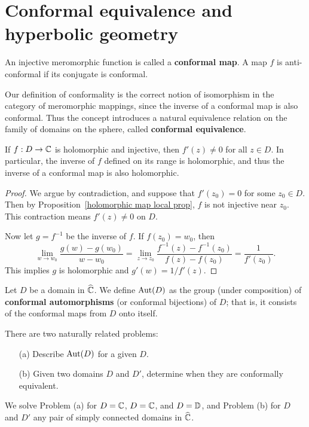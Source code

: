 \section{Conformal equivalence and hyperbolic geometry}
\begin{definition}
An injective meromorphic function is called a \textbf{conformal map}. A map $f$ is anti-conformal if its conjugate is conformal.
\end{definition}
Our definition of conformality is the correct notion of isomorphism in the
category of meromorphic mappings, since the inverse of a conformal map is also conformal. Thus the concept introduces a natural equivalence relation on the family of domains on the sphere, called \textbf{conformal equivalence}.
\begin{proposition}
If $f:D\to\mathbb{C}$ is holomorphic and injective, then $f'(z)\neq 0$ for all $z\in D$. In particular, the inverse of $f$ defined on its range is holomorphic, and thus the inverse of a conformal map is also holomorphic.
\end{proposition}
\begin{proof}
We argue by contradiction, and suppose that $f'(z_0)=0$ for some $z_0\in D$. Then by Proposition~\ref{holomorphic map local prop}, $f$ is not injective near $z_0$. This contraction means $f'(z)\neq 0$ on $D$.\par
Now let $g=f^{-1}$ be the inverse of $f$. If $f(z_0)=w_0$, then
\[\lim_{w\to w_0}\frac{g(w)-g(w_0)}{w-w_0}=\lim_{z\to z_0}\frac{f^{-1}(z)-f^{-1}(z_0)}{f(z)-f(z_0)}=\frac{1}{f'(z_0)}.\]
This implies $g$ is holomorphic and $g'(w)=1/f'(z)$.
\end{proof}
\begin{definition}
Let $D$ be a domain in $\widehat{\mathbb{C}}$. We define $\mathrm{Aut}(D)$ as the group (under composition) of \textbf{conformal automorphisms} (or conformal bijections) of $D$; that is, it consists of the conformal maps from $D$ onto itself.
\end{definition}
There are two naturally related problems:
\begin{itemize}
\item[(a)] Describe $\mathrm{Aut}(D)$ for a given $D$.
\item[(b)] Given two domains $D$ and $D'$, determine when they are conformally equivalent.
\end{itemize}
We solve Problem (a) for $D=\mathbb{C}$, $D=\mathbb{C}$, and $D=\mathbb{D}$, and Problem (b) for $D$ and $D'$ any pair of simply connected domains in $\widehat{\mathbb{C}}$.
